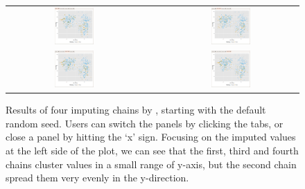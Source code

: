 \documentclass[article]{jss}
\begin{document}
\begin{center}
\begin{figure}[h]
\begin{centering}
\begin{tabular}{cccc}
\includegraphics[width=0.3\textwidth]{graph/fig10-1-chain} &  &  & \includegraphics[width=0.3\textwidth]{graph/fig10-2-chain}\tabularnewline
\includegraphics[width=0.3\textwidth]{graph/fig10-3-chain} &  &  & \includegraphics[width=0.3\textwidth]{graph/fig10-4-chain}\tabularnewline
\end{tabular}
\par\end{centering}
\caption{Results of four imputing chains by , starting with the default random seed. Users can switch the panels by clicking the tabs, or close a panel by hitting the `x' sign. Focusing on the imputed values at the left side of the plot, we can see that the first, third and fourth chains cluster values in a small range of y-axis, but the second chain spread them very evenly in the y-direction.}
\label{fig:chaintabs}
\end{figure}
\par\end{center}
\end{document}
